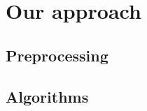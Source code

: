 \section{Our approach} %
\label{cha:approach}

\subsection{Preprocessing}
\label{sec:preprocessing}


\subsection{Algorithms}
\label{sec:algorithms}